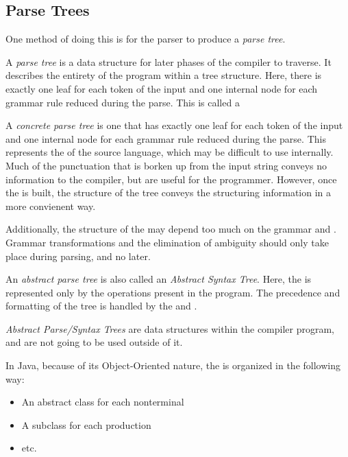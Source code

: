 \subsection{Parse Trees}\label{subsec:Parse_Trees}
One method of doing this is for the parser to produce a \emph{parse tree}.
\begin{definition}\label{def:Parse_Tree}
  A \emph{parse tree} is a data structure for later phases of the compiler to traverse.
  It describes the entirety of the program within a tree structure.
  Here, there is exactly one leaf for each token of the input and one internal node for each grammar rule reduced during the parse.
  This is called a 
\end{definition}

\begin{definition}\label{def:Concrete_Parse_Tree}
  A \emph{concrete parse tree} is one that has exactly one leaf for each token of the input and one internal node for each grammar rule reduced during the parse.
  This represents the \emph{} of the source language, which may be difficult to use internally.
  Much of the punctuation that is borken up from the input string conveys no information to the compiler, but are useful for the programmer.
  However, once the  is built, the structure of the tree conveys the structuring information in a more convienent way.

  Additionally, the structure of the  may depend too much on the grammar and .
  Grammar transformations and the elimination of ambiguity should only take place during parsing, and no later.
\end{definition}

\begin{definition}\label{def:Abstract_Parse_Tree}
  An \emph{abstract parse tree} is also called an \emph{Abstract Syntax Tree}.
  Here, the  is represented only by the operations present in the program.
  The precedence and formatting of the tree is handled by the  and .

  \emph{Abstract Parse/Syntax Trees} are data structures within the compiler program, and are not going to be used outside of it.

  \begin{remark}\label{rmk:Abstract_Syntax_Tree_in_Java}
    In Java, because of its Object-Oriented nature, the  is organized in the following way:
    \begin{itemize}[noitemsep]
    \item An abstract class for each nonterminal
    \item A subclass for each production
    \item etc.
    \end{itemize}
  \end{remark}
\end{definition}

